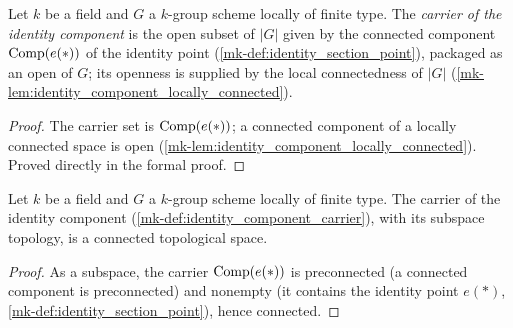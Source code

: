 \begin{definition}\label{mk-def:identity_component_carrier}
  \leanok

  Let \(k\) be a field and \(G\) a \(k\)-group scheme locally of finite
  type. The \emph{carrier of the identity component} is the open subset of
  \(|G|\) given by the connected component
  \(\operatorname{Comp}(e(\ast))\) of the identity point
  (\ref{mk-def:identity_section_point}), packaged as an open of \(G\); its
  openness is supplied by the local connectedness of \(|G|\)
  (\ref{mk-lem:identity_component_locally_connected}).
\end{definition}
\begin{proof}
  The carrier set is \(\operatorname{Comp}(e(\ast))\); a connected component of a
  locally connected space is open
  (\ref{mk-lem:identity_component_locally_connected}). Proved directly in
  the formal proof.
\end{proof}

\begin{lemma}\label{mk-lem:identity_component_carrier_connected}
  \leanok

  Let \(k\) be a field and \(G\) a \(k\)-group scheme locally of finite
  type. The carrier of the identity component
  (\ref{mk-def:identity_component_carrier}), with its subspace topology, is a
  connected topological space.
\end{lemma}
\begin{proof}
  As a subspace, the carrier \(\operatorname{Comp}(e(\ast))\) is preconnected (a
  connected component is preconnected) and nonempty (it contains the
  identity point \(e(\ast)\), \ref{mk-def:identity_section_point}), hence
  connected.
\end{proof}

